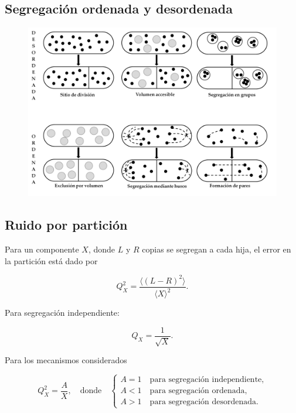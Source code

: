 \documentclass[xcolor=dvipsnames]{beamer}
\begin{document}
\subsection{Segregaci\'on ordenada y desordenada}
\begin{frame}
\begin{figure}[p]
    \centering
    \includegraphics[width=\textwidth]{Pdiv-draws}
\end{figure}
\end{frame}

\subsection{Ruido por partici\'on}
\begin{frame}

Para un componente $X$, donde $L$ y $R$ copias se segregan a cada hija, el error en la partici\'on est\'a dado por

$$Q_X^2 = \frac{\langle (L-R)^2 \rangle}{\langle X \rangle^2}. $$

Para segregaci\'on independiente:

$$Q_X = \frac{1}{\sqrt{X}}.$$

Para los mecanismos considerados

$$ Q_X^2 = \frac{A}{X}, \quad \text{donde} \quad 
\begin{cases}
A = 1 \quad \text{para segregaci\'on independiente,}\\
A < 1 \quad \text{para segregaci\'on ordenada,}\\
A > 1 \quad \text{para segregaci\'on desordenada.}
\end{cases} 
$$

\end{frame}
\end{document}
